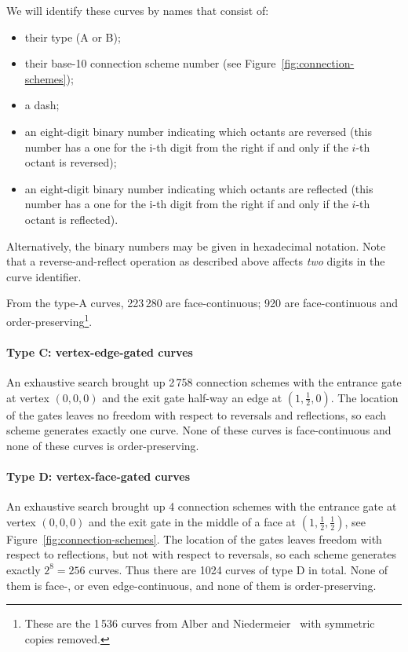 \documentclass[11pt,a4paper]{article}
\begin{document}
We will identify these curves by names that consist of:\begin{itemize}
\item their type (A or B);
\item their base-10 connection scheme number (see Figure~\ref{fig:connection-schemes});
\item a dash;
\item an eight-digit binary number indicating which octants are reversed (this number has a one for the i-th digit from the right if and only if the $i$-th octant is reversed);
\item an eight-digit binary number indicating which octants are reflected (this number has a one for the i-th digit from the right if and only if the $i$-th octant is reflected).
\end{itemize}
Alternatively, the binary numbers may be given in hexadecimal notation. Note that a reverse-and-reflect operation as described above affects \emph{two} digits in the curve identifier.

From the type-A curves, 223\,280 are face-continuous; 920 are face-continuous and order-preserving\footnote{These are the 1\,536 curves from Alber and Niedermeier~\cite{Alber} with symmetric copies removed.}.

\paragraph{Type C: vertex-edge-gated curves}

An exhaustive search brought up 2\,758 connection schemes with the entrance gate at vertex $(0,0,0)$ and the exit gate half-way an edge at $(1,\frac12,0)$. The location of the gates leaves no freedom with respect to reversals and reflections, so each scheme generates exactly one curve. None of these curves is face-continuous and none of these curves is order-preserving.

\paragraph{Type D: vertex-face-gated curves}

An exhaustive search brought up 4 connection schemes with the entrance gate at vertex $(0,0,0)$ and the exit gate in the middle of a face at $(1,\frac12,\frac12)$, see Figure~\ref{fig:connection-schemes}.
The location of the gates leaves freedom with respect to reflections, but not with respect to reversals, so each scheme generates exactly $2^8 = 256$ curves. Thus there are 1024 curves of type D in total. None of them is face-, or even edge-continuous, and none of them is order-preserving.
\end{document}
